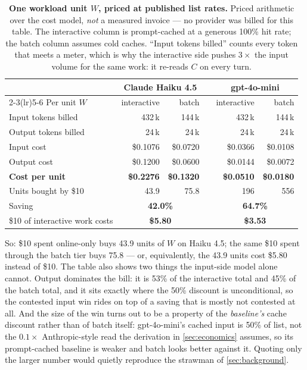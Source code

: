 \documentclass[11pt]{article}
\begin{document}
\begin{table}[!htbp]
\centering\small
\caption{\textbf{One workload unit $W$, priced at published list rates.} Priced arithmetic over the cost model, \emph{not} a measured invoice --- no provider was billed for this table. The interactive column is prompt-cached at a generous 100\% hit rate; the batch column assumes cold caches. ``Input tokens billed'' counts every token that meets a meter, which is why the interactive side pushes $3\times$ the input volume for the same work: it re-reads $C$ on every turn.}
\label{tab:tendollars}
\begin{tabular}{@{}lrrcrr@{}}
\toprule
 & \multicolumn{2}{c}{Claude Haiku 4.5} & & \multicolumn{2}{c}{gpt-4o-mini} \\
\cmidrule(lr){2-3}\cmidrule(lr){5-6}
Per unit $W$ & interactive & batch & & interactive & batch \\
\midrule
Input tokens billed & 432\,k & 144\,k & & 432\,k & 144\,k \\
Output tokens billed & 24\,k & 24\,k & & 24\,k & 24\,k \\
\midrule
Input cost & \$0.1076 & \$0.0720 & & \$0.0366 & \$0.0108 \\
Output cost & \$0.1200 & \$0.0600 & & \$0.0144 & \$0.0072 \\
\textbf{Cost per unit} & \textbf{\$0.2276} & \textbf{\$0.1320} & & \textbf{\$0.0510} & \textbf{\$0.0180} \\
\midrule
Units bought by \$10 & 43.9 & 75.8 & & 196 & 556 \\
Saving & \multicolumn{2}{c}{\textbf{42.0\%}} & & \multicolumn{2}{c}{\textbf{64.7\%}} \\
\$10 of interactive work costs & \multicolumn{2}{c}{\textbf{\$5.80}} & & \multicolumn{2}{c}{\textbf{\$3.53}} \\
\bottomrule
\end{tabular}
\end{table}

\FloatBarrier

So: \$10 spent online-only buys 43.9 units of $W$ on Haiku 4.5; the same \$10 spent through the batch tier buys 75.8 --- or, equivalently, the 43.9 units cost \$5.80 instead of \$10. The table also shows two things the input-side model alone cannot. Output dominates the bill: it is 53\% of the interactive total and 45\% of the batch total, and it sits exactly where the 50\% discount is unconditional, so the contested input win rides on top of a saving that is mostly not contested at all. And the size of the win turns out to be a property of the \emph{baseline's} cache discount rather than of batch itself: gpt-4o-mini's cached input is 50\% of list, not the $0.1\times$ Anthropic-style read the derivation in \cref{sec:economics} assumes, so its prompt-cached baseline is weaker and batch looks better against it. Quoting only the larger number would quietly reproduce the strawman of \cref{sec:background}.
\end{document}
